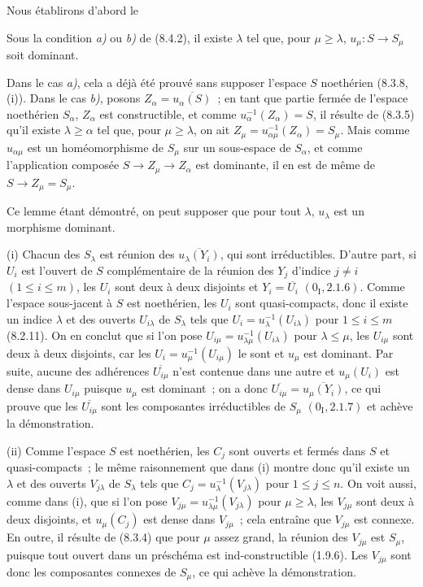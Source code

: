 Nous établirons d'abord le

\begin{lemma}[8.4.2.1]
\label{IV.8.4.2.1-fr}
Sous la condition \emph{a)} ou \emph{b)} de (8.4.2), il existe $\lambda$ tel
que, pour $\mu\geq\lambda$, $u_\mu:S\to S_\mu$ soit dominant.
\end{lemma}

Dans le cas \emph{a)}, cela a déjà été prouvé sans supposer l'espace $S$
noethérien (8.3.8, (i)). Dans le cas \emph{b)}, posons
$Z_\alpha=\overline{u_\alpha(S)}$~; en tant que partie fermée de l'espace
noethérien $S_\alpha$, $Z_\alpha$ est constructible, et comme
$u_\alpha^{-1}(Z_\alpha)=S$, il résulte de (8.3.5) qu'il existe
$\lambda\geq\alpha$ tel que, pour $\mu\geq\lambda$, on ait
$Z_\mu=u_{\alpha\mu}^{-1}(Z_\alpha)=S_\mu$. Mais comme $u_{\alpha\mu}$ est
un homéomorphisme de $S_\mu$ sur un sous-espace de $S_\alpha$, et comme
l'application composée $S\to Z_\mu\to Z_\alpha$ est dominante, il en est de
même de $S\to Z_\mu=S_\mu$.

Ce lemme étant démontré, on peut supposer que pour tout $\lambda$,
$u_\lambda$ est un morphisme dominant.

\medskip
\noindent
(i) Chacun des $S_\lambda$ est réunion des
$\overline{u_\lambda(Y_i)}$, qui sont irréductibles. D'autre part, si $U_i$
est l'ouvert de $S$ complémentaire de la réunion des $Y_j$ d'indice $j\neq i$
$(1\leq i\leq m)$, les $U_i$ sont deux à deux disjoints et
$Y_i=\overline{U_i}$ $(0_{\mathrm I},2.1.6)$. Comme l'espace sous-jacent à
$S$ est noethérien, les $U_i$ sont quasi-compacts, donc il existe un indice
$\lambda$ et des ouverts $U_{i\lambda}$ de $S_\lambda$ tels que
$U_i=u_\lambda^{-1}(U_{i\lambda})$ pour $1\leq i\leq m$ (8.2.11). On en
conclut que si l'on pose
$U_{i\mu}=u_{\lambda\mu}^{-1}(U_{i\lambda})$ pour $\lambda\leq\mu$, les
$U_{i\mu}$ sont deux à deux disjoints, car les
$U_i=u_\mu^{-1}(U_{i\mu})$ le sont et $u_\mu$ est dominant. Par suite,
aucune des adhérences $\overline{U_{i\mu}}$ n'est contenue dans une autre et
$u_\mu(U_i)$ est dense dans $U_{i\mu}$ puisque $u_\mu$ est dominant~; on a
donc
$\overline{U_{i\mu}}=\overline{u_\mu(Y_i)}$, ce qui prouve que les
$\overline{U_{i\mu}}$ sont les composantes irréductibles de $S_\mu$
$(0_{\mathrm I},2.1.7)$ et achève la démonstration.

\medskip
\noindent
(ii) Comme l'espace $S$ est noethérien, les $C_j$ sont ouverts et fermés dans
$S$ et quasi-compacts~; le même raisonnement que dans (i) montre donc qu'il
existe un $\lambda$ et des ouverts $V_{j\lambda}$ de $S_\lambda$ tels que
$C_j=u_\lambda^{-1}(V_{j\lambda})$ pour $1\leq j\leq n$. On voit aussi,
comme dans (i), que si l'on pose
$V_{j\mu}=u_{\lambda\mu}^{-1}(V_{j\lambda})$ pour $\mu\geq\lambda$, les
$V_{j\mu}$ sont deux à deux disjoints, et $u_\mu(C_j)$ est dense dans
$V_{j\mu}$~; cela entraîne que $V_{j\mu}$ est connexe. En outre, il résulte
de (8.3.4) que pour $\mu$ assez grand, la réunion des $V_{j\mu}$ est
$S_\mu$, puisque tout ouvert dans un préschéma est ind-constructible (1.9.6).
Les $V_{j\mu}$ sont donc les composantes connexes de $S_\mu$, ce qui achève
la démonstration.

